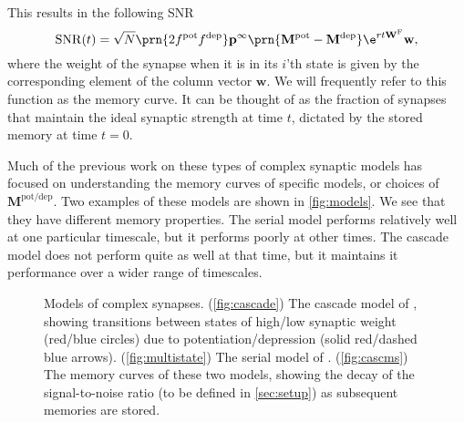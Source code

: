 \documentclass{article} %
\DeclareMathOperator{\snr}{SNR}
\newcommand{\pr}{\mathbf{p}}
\newcommand{\eq}{\pr^\infty}
\newcommand{\w}{\mathbf{w}}
\newcommand{\W}{\mathbf{W}}
\newcommand{\M}{\mathbf{M}}
\newcommand{\frg}{\W^{\mathrm{F}}}
\newcommand{\pot}{^{\text{pot}}}
\newcommand{\dep}{^{\text{dep}}}
\newcommand{\potdep}{^{\text{pot/dep}}}
\begin{document}
This results in the following SNR
%
\begin{equation}\label{eq:SNRcalc}
  \snr(t) = \sqrt{N}\prn{2 f\pot f\dep} \eq \prn{\M\pot-\M\dep} \e^{rt\frg} \w,
\end{equation}
%
where the weight of the synapse when it is in its $i$'th state is given by the corresponding element of the column vector $\w$.
We will frequently refer to this function as the memory curve.
It can be thought of as the fraction of synapses that maintain the ideal synaptic strength at time $t$, dictated by the stored memory at time $t=0$.


Much of the previous work on these types of complex synaptic models has focused on understanding the memory curves of specific models, or choices of $\M\potdep$.
Two examples of these models are shown in \autoref{fig:models}. We see that they have different memory properties.
The serial model performs relatively well at one particular timescale, but it performs poorly at other times.
The cascade model does not perform quite as well at that time, but it maintains it performance over a wider range of timescales.

\begin{figure}[tbp]
 \begin{center}
 \begin{myenuma}
  \item{}\label{fig:cascade}
  \item{}\label{fig:multistate}
  \item{}\label{fig:cascms}
 \end{myenuma}
 \end{center}
  \caption{Models of complex synapses.
  (\ref{fig:cascade}) The cascade model of \cite{Fusi2005cascade}, showing transitions between states of high/low synaptic weight (red/blue circles) due to potentiation/depression (solid red/dashed blue arrows).
  (\ref{fig:multistate}) The serial model of \cite{Leibold2008serial}.
  (\ref{fig:cascms}) The memory curves of these two models, showing the decay of the signal-to-noise ratio (to be defined in \autoref{sec:setup}) as subsequent memories are stored.
  }\label{fig:models}
\end{figure}
\end{document}
